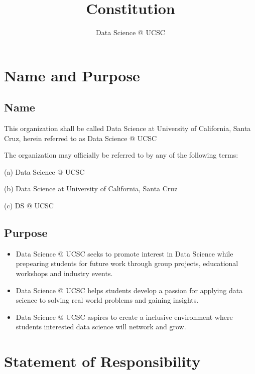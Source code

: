 \documentclass{article}
\title{Constitution}
\author{Data Science @ UCSC}
\newcommand{\SubItem}[1]{
    {\setlength\itemindent{15pt} \item[] #1}
}
\begin{document}
\maketitle
\tableofcontents

\newpage

\section{Name and Purpose}

\subsection{Name}

\begin{itemize}
    \item[1.] This organization shall be called Data Science at University of California, Santa Cruz, herein referred to as Data Science @ UCSC 
    \item[2.]  The organization may officially be referred to by any of the following terms:
    \SubItem{} (a) Data Science @ UCSC
    \SubItem{} (b) Data Science at University of California, Santa Cruz
    \SubItem{} (c) DS @ UCSC 
    \item[] %
\end{itemize}


\subsection{Purpose}

\begin{itemize}
    \item[1.] Data Science @ UCSC seeks to promote interest in Data Science
    while prepearing students for future work through group projects, educational workshops and industry events.
    \item[2.] Data Science @ UCSC helps students develop a passion for applying data science to solving real world problems and gaining insights.
    \item[3.] Data Science @ UCSC aspires to create a inclusive environment where students interested data science will network and grow.
\end{itemize}

\section{Statement of Responsibility}
\end{document}
